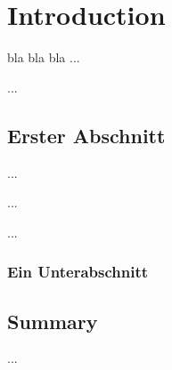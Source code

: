 
\chapter{Introduction}
\label{cha:Introduction}

bla bla bla ...

...



\section{Erster Abschnitt}
\label{sec:Abschnitt1}

\cite{Dre2012}

...

...

...


\subsection{Ein Unterabschnitt}



\section{Summary}

...
